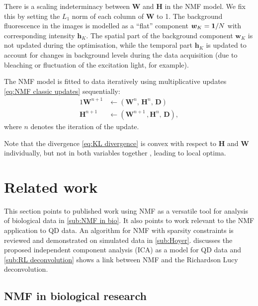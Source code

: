 There is a scaling indeterminacy between $\bm{W}$ and $\bm{H}$ in the NMF model. We fix this by setting the $L_1$ norm of each column of $\bm{W}$ to 1. The background fluorescence in the images is modelled as a ``flat'' component $\bm{w}_K = \mathbf{1}/N$ with corresponding intensity $\bm{h}_K$. The spatial part of the background component $\bm{w}_K$ is not updated during the optimisation, while the temporal part $\bm{h}_K$ is updated to account for changes in background levels during the data acquisition (due to bleaching or fluctuation of the excitation light, for example).

The NMF model is fitted to data iteratively using multiplicative updates \autoref{eq:NMF classic updates} sequentially: 
%	
\begin{alignat}{1}
	\bm{W}^{n+1} & \longleftarrow \left(\bm{W}^n,\, \bm{H}^n,\, \bm{D}\right)\\
	\bm{H}^{n+1} & \longleftarrow \left(\bm{W}^{n+1}\,, \bm{H}^n,\, \bm{D}\right),
\end{alignat}
%
where $n$ denotes the iteration of the update.

Note that the divergence \autoref{eq:KL divergence} is convex with respect to $\bm{H}$ and $\bm{W}$ individually, but not in both variables together \cite{Lee2001}, leading to local optima.
\afterpage{\clearpage}

\section{Related work \label{sec:NMF related}}
This section points to published work using NMF as a versatile tool for analysis of biological data in \autoref{sub:NMF in bio}. It also points to work relevant to the NMF application to QD data. An algorithm for NMF with sparsity constraints is reviewed and demonstrated on simulated data in \autoref{sub:Hoyer}.  discusses the proposed independent component analysis (ICA) as a model for QD data and \autoref{sub:RL deconvolution} shows a link between NMF and the Richardson \textendash{} Lucy deconvolution.

\subsection{NMF in biological research\label{sub:NMF in bio}}

